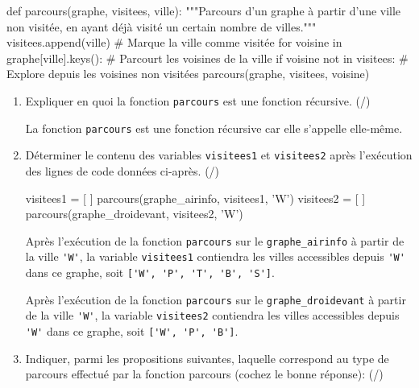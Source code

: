 \begin{CodePythontexAlt}[TaillePolice=\large, Largeur=1\linewidth,Centre,Lignes=true,PremLigne=1]{}
def parcours(graphe, visitees, ville):
    """Parcours d'un graphe à partir d'une ville non visitée, 
    en ayant déjà visité un certain nombre de villes."""
    visitees.append(ville)              # Marque la ville comme visitée
    for voisine in graphe[ville].keys():       # Parcourt les voisines de la ville
        if voisine not in visitees:
            # Explore depuis les voisines non visitées
            parcours(graphe, visitees, voisine)  
\end{CodePythontexAlt}

\pagebreak

\begin{enumerate}[resume=monDS]
\item  Expliquer en quoi la fonction \texttt{parcours} est une fonction récursive. (/)
\begin{blocvisible}[height=1.5]
    La fonction \texttt{parcours} est une fonction récursive car elle s'appelle elle-même. 
\end{blocvisible}

\medskip

\item Déterminer le contenu des variables \texttt{visitees1} et \texttt{visitees2} après l'exécution des lignes de code données ci-après. (/)

\begin{CodePythontexAlt}[TaillePolice=\large, Largeur=1\linewidth,Centre,Lignes=true,PremLigne=1]{}
visitees1 = [ ]
parcours(graphe_airinfo, visitees1, 'W')
visitees2 = [ ]
parcours(graphe_droidevant, visitees2, 'W')
\end{CodePythontexAlt}

\begin{blocvisible}[height=3]
    Après l'exécution de la fonction \texttt{parcours} sur le \texttt{graphe\_airinfo} à partir de la ville \verb|'W'|, la variable \texttt{visitees1} contiendra les villes accessibles depuis \verb|'W'| dans ce graphe, soit \verb|['W', 'P', 'T', 'B', 'S']|.

    Après l'exécution de la fonction \texttt{parcours} sur le \texttt{graphe\_droidevant} à partir de la ville \verb|'W'|, la variable \texttt{visitees2} contiendra les villes accessibles depuis \verb|'W'| dans ce graphe, soit \verb|['W', 'P', 'B']|.
\end{blocvisible}

\medskip
\item Indiquer, parmi les propositions suivantes, laquelle correspond au type de parcours effectué par la fonction parcours (cochez le bonne réponse): (/)



\end{enumerate}
